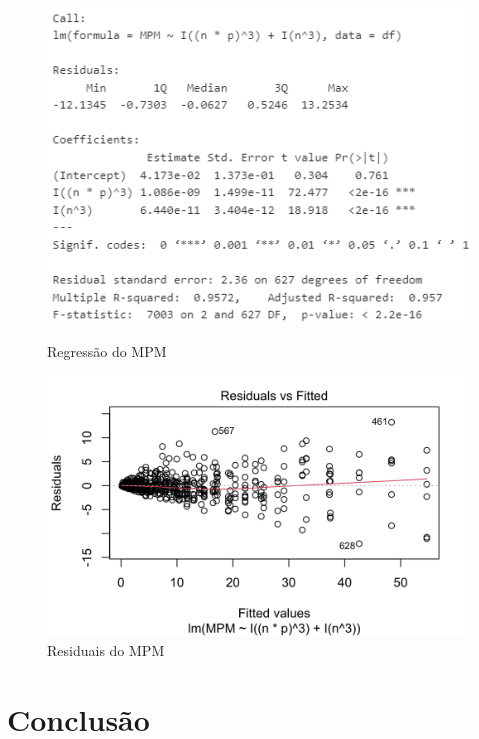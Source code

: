 \documentclass{uofa-eng-assignment}
\begin{document}
\begin{figure}[h]
    \centering
    \begin{minipage}{0.45\textwidth}
        \centering
        \includegraphics[width=1\textwidth]{mpm lm.png}
        \caption{Regressão do MPM}
        \label{fig:mpm-regression-2}
    \end{minipage}
    \hfill
    \begin{minipage}{0.45\textwidth}
        \centering
        \includegraphics[width=1\textwidth]{residuals-mpm.png}
        \caption{Residuais do MPM}
        \label{fig:mpm-residuals}
    \end{minipage}
\end{figure}




\WFclear
\newpage
\section{Conclusão}
\end{document}
